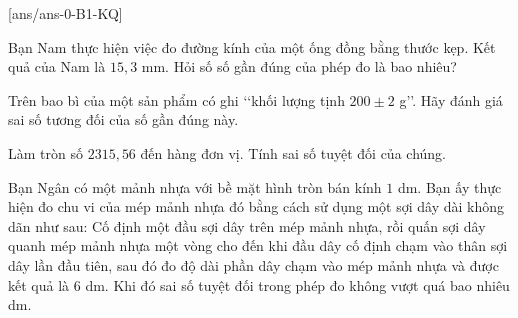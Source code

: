 [ans/ans-0-B1-KQ]
\caukq
\begin{ex}%
	Bạn Nam thực hiện việc đo đường kính của một ống đồng bằng thước kẹp. Kết quả của Nam là $15{,}3$ mm. Hỏi số  số gần đúng của phép đo là bao nhiêu?
\end{ex}
\begin{ex}%
	Trên bao bì của một sản phẩm có ghi \lq\lq khối lượng tịnh $200\pm 2$ g\rq\rq. Hãy đánh giá sai số tương đối của số gần đúng này.
\end{ex}
\begin{ex}%
	Làm tròn số $2315{,}56$ đến hàng đơn vị. Tính sai số tuyệt đối của chúng.
\end{ex}
\begin{ex}%
	Bạn Ngân có một mảnh nhựa với bề mặt hình tròn bán kính $1$ dm. Bạn ấy thực hiện đo chu vi của mép mảnh nhựa đó bằng cách sử dụng một sợi dây dài không dãn như sau: Cố định một đầu sợi dây trên mép mảnh nhựa, rồi quấn sợi dây quanh mép mảnh nhựa một vòng cho đến khi đầu dây cố định chạm vào thân sợi dây lần đầu tiên, sau đó đo độ dài phần dây chạm vào mép mảnh nhựa và được kết quả là $6$ dm. Khi đó sai số tuyệt đối trong phép đo không vượt quá bao nhiêu dm.
\end{ex}

